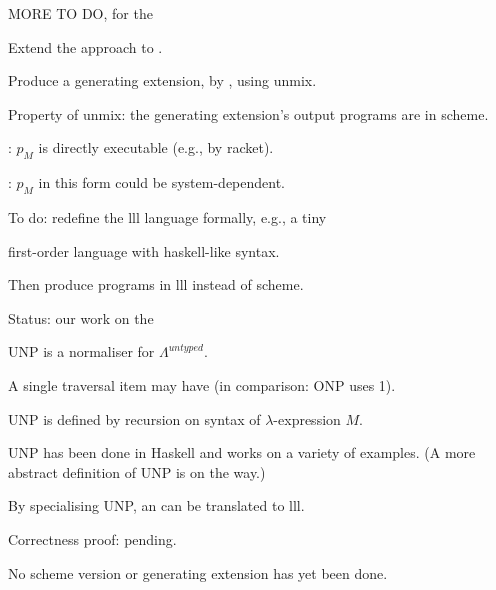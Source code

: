 \documentclass[12pt,fleqn,landscape]{article}
\begin{document}
\begin{slide}{MORE TO DO,  for the  \lc }

\be

\item Extend the approach to .
\vair

\item Produce a generating extension,  by ,  using {\sc unmix}. 
\vair

\item Property of {\sc unmix}: the generating extension's output programs are  in {\sc scheme}. 

\bi
\item 
{}: $p_M$ is directly executable (e.g., by {\sc racket}).
\vair

\item {}: $p_M$ in this form could be system-dependent. 
\ei
\vair

\item To do: redefine the {\sc lll} language formally, e.g., a tiny

\hfill  first-order  language with {\sc haskell}-like syntax.
\vair\vair

\item Then produce programs in  {\sc lll}  instead of {\sc scheme}.

\ee

\end{slide}


\begin{slide}{Status:  our work on the  \lc }

\be

\item UNP is a normaliser for $\Lambda^{untyped}$.
\vair

\item A single traversal item may have  (in comparison: ONP uses 1).
\vair

\item  UNP   is defined  by   recursion on  syntax of  $\lambda$-expression $M$.
\vair

\item UNP has been  done in {\sc Haskell} and works on a variety of examples. (A more abstract definition of UNP is on the way.)

\item By specialising UNP, an  can be translated to {\sc lll}.
\vair

\item Correctness proof: pending.

\vair

\item No {\sc scheme} version or generating extension has yet been done.
\ee

\end{slide}
\end{document}

